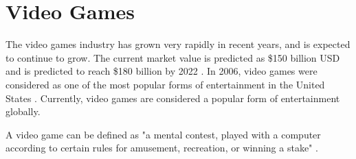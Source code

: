 \documentclass[a4paper,11.5pt]{report}
\numberwithin{figure}{section}
\numberwithin{table}{section}
\numberwithin{equation}{section}
\numberwithin{equation}{section}
\begin{document}



\section{Video Games}




The video games industry has grown very rapidly in recent years, and is expected to continue to grow. The current market value is predicted as \$150 billion USD and is predicted to reach \$180 billion by 2022 \citep{vgamesResearch}. In 2006, video games were considered as one of the most popular forms of entertainment in the United States \citep{sherry2006, ritterfeld2006}. Currently, video games are considered a popular form of entertainment globally.


A video game can be defined as "a mental contest, played with a computer according to certain rules for amusement, recreation, or winning a stake" \citep{Zyda2005}.
\end{document}
